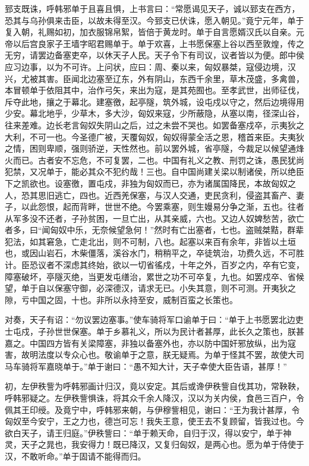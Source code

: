 \documentclass[12pt,UTF8]{ctexbook}
\begin{document}
郅支既诛，呼韩邪单于且喜且惧，上书言曰：“常愿谒见天子，诚以郅支在西方，恐其与乌孙俱来击臣，以故未得至汉。今郅支已伏诛，愿入朝见。”竟宁元年，单于复入朝，礼赐如初，加衣服锦帛絮，皆倍于黄龙时。单于自言愿婿汉氏以自亲。元帝以后宫良家子王墙字昭君赐单于。单于欢喜，上书愿保塞上谷以西至敦煌，传之无穷，请罢边备塞吏卒，以休天子人民。天子令下有司议，议者皆以为便。郎中侯应习边事，以为不可许。上问状，应曰：周、秦以来，匈奴暴桀，寇侵边境，汉兴，尤被其害。臣闻北边塞至辽东，外有阴山，东西千余里，草木茂盛，多禽兽，本冒顿单于依阻其中，治作弓矢，来出为寇，是其苑囿也。至孝武世，出师征伐，斥夺此地，攘之于幕北。建塞徼，起亭隧，筑外城，设屯戍以守之，然后边境得用少安。幕北地乎，少草木，多大沙，匈奴来寇，少所蔽隐，从塞以南，径深山谷，往来差难。边长老言匈奴失阴山之后，过之未尝不哭也。如罢备塞戍卒，示夷狄之大利，不可一也。今圣德广被，天覆匈奴，匈奴得蒙全活之恩，稽首来臣。夫夷狄之情，困则卑顺，强则骄逆，天性然也。前以罢外城，省亭隧，今裁足以候望通烽火而已。古者安不忘危，不可复罢，二也。中国有礼义之教、刑罚之诛，愚民犹尚犯禁，又况单于，能必其众不犯约哉！三也。自中国尚建关梁以制诸侯，所以绝臣下之凯欲也。设塞徼，置屯戍，非独为匈奴而已，亦为诸属国降民，本故匈奴之人，恐其思旧逃亡，四也。近西羌保塞，与汉人交通，吏民贪利，侵盗其畜产、妻子，以此怨恨，起而背畔，世世不绝。今罢乘塞，则生嫚易分争之渐，五也。往者从军多没不还者，子孙贫困，一旦亡出，从其亲威，六也。又边人奴婢愁苦，欲亡者多，曰“闻匈奴中乐，无奈候望急何！”然时有亡出塞者，七也。盗贼桀黠，群辈犯法，如其窘急，亡走北出，则不可制，八也。起塞以来百有余年，非皆以土垣也，或因山岩石，木柴僵落，溪谷水门，稍稍平之，卒徒筑治，功费久远，不可胜计。臣恐议者不深虑其终始，欲以一切省徭戍，十年之外，百岁之内，卒有它变，障塞破坏，亭隧灭绝，当更发屯缮治，累世之功不可卒复，九也。如罢戍卒、省候望，单于自以保塞守御，必深德汉，请求无已。小失其意，则不可测。开夷狄之隙，亏中国之固，十也。非所以永持至安，威制百蛮之长策也。



对奏，天子有诏：“勿议罢边塞事。”使车骑将军口谕单于曰：“单于上书愿罢北边吏士屯戍，子孙世世保塞。单于乡慕礼义，所以为民计者甚厚，此长久之策也，朕甚嘉之。中国四方皆有关梁障塞，非独以备塞外也，亦以防中国奸邪放纵，出为寇害，故明法度以专众心也。敬谕单于之意，朕无疑焉。为单于怪其不罢，故使大司马车骑将军嘉晓单于。”单于谢曰：“愚不知大计，天子幸使大臣告语，甚厚！”



初，左伊秩訾为呼韩邪画计归汉，竟以安定。其后或谗伊秩訾自伐其功，常鞅鞅，呼韩邪疑之。左伊秩訾惧诛，将其众千余人降汉，汉以为关内侯，食邑三百户，令佩其王印绶。及竟宁中，呼韩邪来朝，与伊穆訾相见，谢曰：“王为我计甚厚，令匈奴至今安宁，王之力也，德岂可忘！我失王意，使王去不复顾留，皆我过也。今欲白天子，请王归庭。”伊秩訾曰：“单于赖天命，自归于汉，得以安宁，单于神灵，天子之晁也，我安得力！既已降汉，又复归匈奴，是两心也。愿为单于侍使于汉，不敢听命。”单于固请不能得而归。
\end{document}
